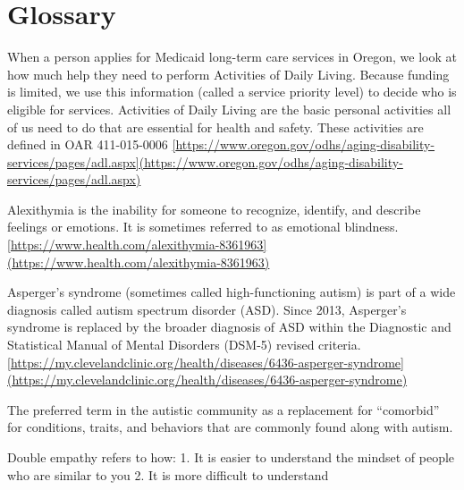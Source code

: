 \documentclass[
  letterpaper,
  DIV=11,
  numbers=noendperiod]{scrreprt}
\providecommand{\tightlist}{%
  \setlength{\itemsep}{0pt}\setlength{\parskip}{0pt}}\usepackage{longtable,booktabs,array}
\begin{document}
\chapter{Glossary}\label{sec-glossary}

\begin{description}
\tightlist
\item[ADLs]
When a person applies for Medicaid long-term care services in Oregon, we
look at how much help they need to perform Activities of Daily Living.
Because funding is limited, we use this information (called a service
priority level) to decide who is eligible for services. Activities of
Daily Living are the basic personal activities all of us need to do that
are essential for health and safety. These activities are defined in OAR
411-015-0006
\href{https://www.oregon.gov/odhs/aging-disability-services/pages/adl.aspx\%5D(https://www.oregon.gov/odhs/aging-disability-services/pages/adl.aspx)}{{[}https://www.oregon.gov/odhs/aging-disability-services/pages/adl.aspx{]}(https://www.oregon.gov/odhs/aging-disability-services/pages/adl.aspx)}
\item[Alexithymia]
Alexithymia is the inability for someone to recognize, identify, and
describe feelings or emotions. It is sometimes referred to as emotional
blindness.
\href{https://www.health.com/alexithymia-8361963\%5D(https://www.health.com/alexithymia-8361963)}{{[}https://www.health.com/alexithymia-8361963{]}(https://www.health.com/alexithymia-8361963)}
\item[Asperger's Syndrome]
Asperger's syndrome (sometimes called high-functioning autism) is part
of a wide diagnosis called autism spectrum disorder (ASD). Since 2013,
Asperger's syndrome is replaced by the broader diagnosis of ASD within
the Diagnostic and Statistical Manual of Mental Disorders (DSM-5)
revised criteria.
\href{https://my.clevelandclinic.org/health/diseases/6436-asperger-syndrome\%5D(https://my.clevelandclinic.org/health/diseases/6436-asperger-syndrome)}{{[}https://my.clevelandclinic.org/health/diseases/6436-asperger-syndrome{]}(https://my.clevelandclinic.org/health/diseases/6436-asperger-syndrome)}
\item[Co-Occurring Conditions]
The preferred term in the autistic community as a replacement for
``comorbid'' for conditions, traits, and behaviors that are commonly
found along with autism.
\item[Double Empathy]
Double empathy refers to how: 1. It is easier to understand the mindset
of people who are similar to you 2. It is more difficult to understand

\end{description}
\end{document}
